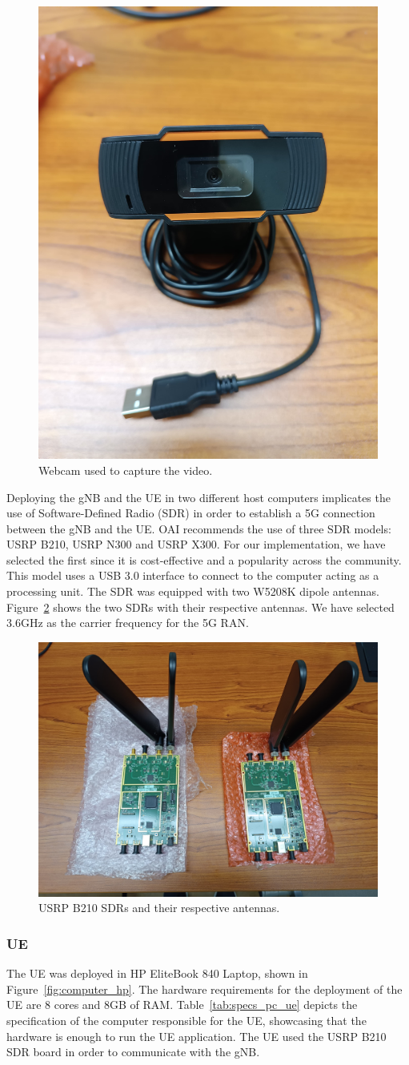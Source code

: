 \begin{figure}[H]
    \centering
    \includegraphics[width=0.3\linewidth]{figures/webcam}
    \caption{Webcam used to capture the video.}
    \label{fig:camera}
\end{figure}

Deploying the gNB and the UE in two different host computers implicates the use of Software-Defined Radio (SDR) in order to establish a 5G connection between the gNB and the UE\@.
OAI recommends the use of three SDR models: USRP B210, USRP N300 and USRP X300\@ \cite{openairinterface_tutorial}.
For our implementation, we have selected the first since it is cost-effective and a popularity across the community.
This model uses a USB 3.0 interface to connect to the computer acting as a processing unit.
The SDR was equipped with two W5208K dipole antennas.
Figure~\ref{fig:SDRs} shows the two SDRs with their respective antennas.
We have selected 3.6GHz as the carrier frequency for the 5G RAN\@.

\begin{figure}[H]
    \centering
    \includegraphics[width=0.5\linewidth]{figures/SDRs}
    \caption{USRP B210 SDRs and their respective antennas.}
    \label{fig:SDRs}
\end{figure}



\subsubsection{UE}
The UE was deployed in HP EliteBook 840 Laptop, shown in Figure~\ref{fig:computer_hp}.
The hardware requirements for the deployment of the UE are 8 cores and 8GB of RAM\@.
Table~\ref{tab:specs_pc_ue} depicts the specification of the computer responsible for the UE\@, showcasing that the hardware is enough to run the UE application.
The UE used the USRP B210 SDR board in order to communicate with the gNB\@.

